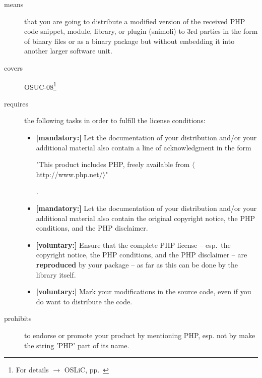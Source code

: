 \begin{description}

\item[means] that you are going to distribute a modified version of the received
PHP code snippet, module, library, or plugin (snimoli) to 3rd parties in the
form of binary files or as a binary package but without embedding it into
another larger software unit.

\item[covers] OSUC-08\footnote{For details $\rightarrow$ OSLiC, pp.\ \pageref{OSUC-08-DEF}}

\item[requires] the following tasks in order to fulfill the license conditions:
\begin{itemize}
  
  \item \textbf{[mandatory:]} Let the documentation of your distribution and/or
  your additional material also contain a line of acknowledgment in the form
  \begin{footnotesize}"This product includes PHP, freely available from
  $\langle$http://www.php.net/$\rangle$"\end{footnotesize}.
    
  \item \textbf{[mandatory:]} Let the documentation of your distribution and/or
  your additional material also contain the original copyright notice, the PHP
  conditions, and the PHP disclaimer.

  \item \textbf{[voluntary:]} Ensure that the complete PHP license -- esp.\ the
  copyright notice, the PHP conditions, and the PHP disclaimer -- are
  \textbf{reproduced} by your package -- as far as this can be done by the
  library itself.
  
  \item \textbf{[voluntary:]} Mark your modifications in the source code,
  even if you do want to distribute the code.

\end{itemize}

\item[prohibits] to endorse or promote your product by mentioning PHP, esp. not
by make the string 'PHP' part of its name.

\end{description}

